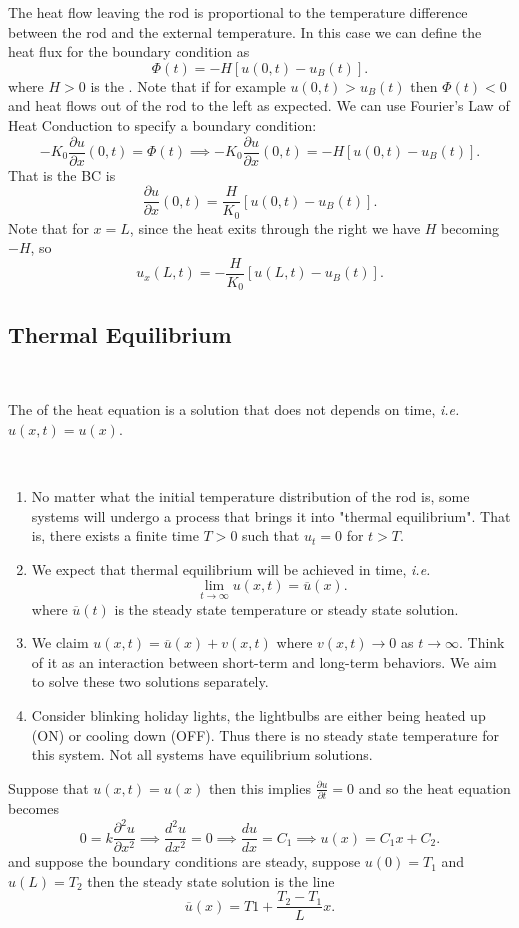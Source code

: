 \documentclass[class=article,crop=false]{standalone}
\begin{document}
\begin{thm}
The heat flow leaving the rod is proportional to the temperature difference between the rod and the external temperature. In this case we can define the heat flux for the boundary condition as
\[
	\Phi(t) = -H [u(0,t) - u_B(t)]
.\] 
where $ H>0$ is the  . Note that if for example $ u(0,t) > u_B(t)$ then  $ \Phi(t)<0$ and heat flows out of the rod to the left as expected. We can use Fourier's Law of Heat Conduction to specify a boundary condition:
\[
	-K_0 \frac{\partial u}{\partial x} (0,t) = \Phi(t) \implies -K_0 \frac{\partial u}{\partial x} (0,t) = -H[u(0,t) - u_B(t)]
.\] 
That is the BC is
\[
	\frac{\partial u}{\partial x} (0,t) = \frac{H}{K_0} [u(0,t) - u_B(t)]
.\] 
Note that for $ x=L$, since the heat exits through the right we have  $ H$ becoming  $ -H$, so
 \[
	 u_x(L,t) = -\frac{H}{K_0}[u(L,t)-u_B(t)]
.\] 
\end{thm}


\subsection{Thermal Equilibrium}
~\begin{defn}[]
	The   of the heat equation is a solution that does not depends on time, \emph{i.e.} $u(x,t) = u(x)$.
\end{defn}
\begin{note}[]
~\begin{enumerate}[label=\arabic*)]
	\item No matter what the initial temperature distribution of the rod is, some systems will undergo a process that brings it into "thermal equilibrium". That is, there exists a finite time $ T>0$  such that $ u_t=0$ for  $ t>T$.
	\item We expect that thermal equilibrium will be achieved in time,  \emph{i.e.} 
		\[
			\lim_{ t \to \infty} u(x,t)= \overline{u}(x)
		.\] 
		where $ \overline{u}(t)$ is the steady state temperature or steady state solution.
	\item We claim $ u(x,t) = \overline{u}(x) + v(x,t)$ where $ v(x,t) \to 0$ as $ t \to \infty$. Think of it as an interaction between short-term and long-term behaviors. We aim to solve these two solutions separately.
	\item Consider blinking holiday lights, the lightbulbs are either being heated up (ON) or cooling down (OFF). Thus there is no steady state temperature for this system. Not all systems have equilibrium solutions.
\end{enumerate}
\end{note}

\begin{eg}[1]
	Suppose that $ u(x,t) = u(x)$ then this implies  $ \frac{\partial u}{\partial t} =0$ and so the heat equation becomes 
	\[
		0=k \frac{\partial^2 u}{\partial {x}^2} \implies \frac{d^2 u}{d {x}^2} = 0 \implies \frac{d u}{d x} =C_1 \implies u(x) = C_1 x + C_2 
	.\]
	and suppose the boundary conditions are steady, suppose $ u(0) = T_1$ and $ u(L) = T_2$ then the steady state solution is the line
	\[
		\overline{u}(x) = T1 + \frac{T_2-T_1}{L} x
	.\] 
\end{eg}
\end{document}
